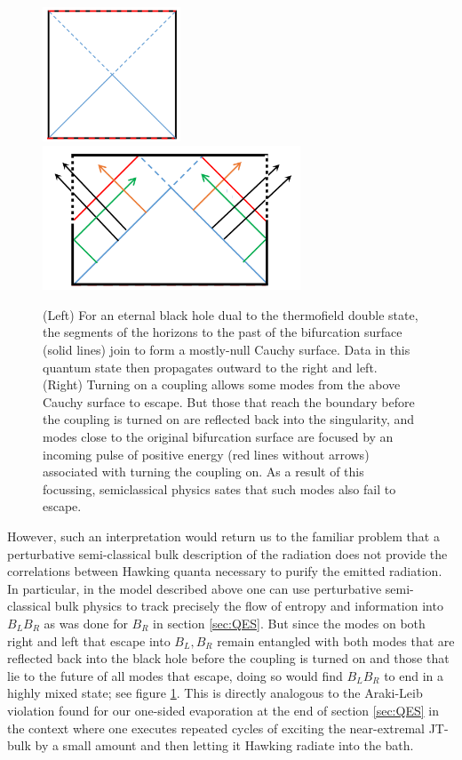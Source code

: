 \documentclass[12pt]{article}
\begin{document}
\begin{figure}
\begin{center}
\includegraphics[height=4cm]{isolatedBH.pdf}
\includegraphics[height=4.3cm]{OpenWindows.pdf}
\end{center}
\caption{(Left) For an eternal black hole dual to the thermofield double state, the segments of the horizons to the past of the bifurcation surface (solid lines) join to form a mostly-null Cauchy surface.  Data in this quantum state then propagates outward to the right and left.  (Right)  Turning on a coupling allows some modes from the above Cauchy surface to escape.  But those that reach the boundary before the coupling is turned on are reflected back into the singularity, and modes close to the original bifurcation surface are focused by an incoming pulse of positive energy (red lines without arrows) associated with turning the coupling on.  As a result of this focussing, semiclassical physics sates that such modes also fail to escape.}
\label{fig:PageTimeEvap2}
\end{figure}


However, such an interpretation would return us to the familiar problem that a perturbative semi-classical bulk description of the radiation does not provide the correlations between Hawking quanta necessary to purify the emitted radiation.  In particular, in the model described above one can use perturbative semi-classical bulk physics to track precisely the flow of entropy and information into $B_LB_R$ as was done for $B_R$ in section \ref{sec:QES}.  But since the modes on both right and left that escape into $B_L,B_R$ remain entangled with both modes that are reflected back into the black hole before the coupling is turned on and those that lie to the future of all modes that escape, doing so would find $B_LB_R$ to end in a highly mixed state; see figure \ref{fig:PageTimeEvap2}.  This is directly analogous to the Araki-Leib violation found for our one-sided evaporation at the end of section \ref{sec:QES} in the context where one executes repeated cycles of exciting the near-extremal JT-bulk by a small amount and then letting it Hawking radiate into the bath.
\end{document}
